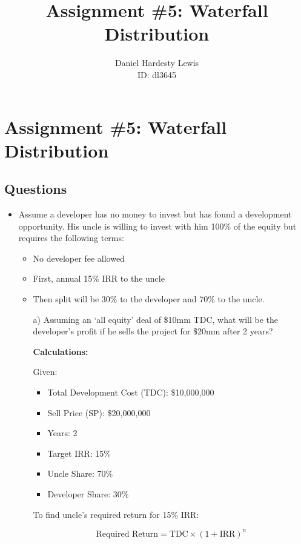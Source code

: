 \documentclass[a1paper]{article}
\title{Assignment \#5: Waterfall Distribution}
\author{Daniel Hardesty Lewis \\ ID: dl3645}
\date{}
\begin{document}
\maketitle

\section*{Assignment \#5: Waterfall Distribution}

\subsection*{Questions}
\begin{itemize}
    \item Assume a developer has no money to invest but has found a development opportunity. His uncle is willing to invest with him 100\% of the equity but requires the following terms:
    \begin{itemize}
        \item No developer fee allowed
        \item First, annual 15\% IRR to the uncle
        \item Then split will be 30\% to the developer and 70\% to the uncle.
    \end{itemize}
    \begin{enumerate}
        \item[a)] Assuming an ‘all equity’ deal of \$10mm TDC, what will be the developer’s profit if he sells the project for \$20mm after 2 years?
        
        \textbf{Calculations:}
        
        Given:
        \begin{itemize}
            \item Total Development Cost (TDC): \$10,000,000
            \item Sell Price (SP): \$20,000,000
            \item Years: 2
            \item Target IRR: 15\%
            \item Uncle Share: 70\%
            \item Developer Share: 30\%
        \end{itemize}
        
        To find uncle's required return for 15\% IRR:
        
        \[
        \text{Required Return} = \text{TDC} \times (1 + \text{IRR})^n
        \]
        

\end{enumerate}
\end{itemize}
\end{document}
